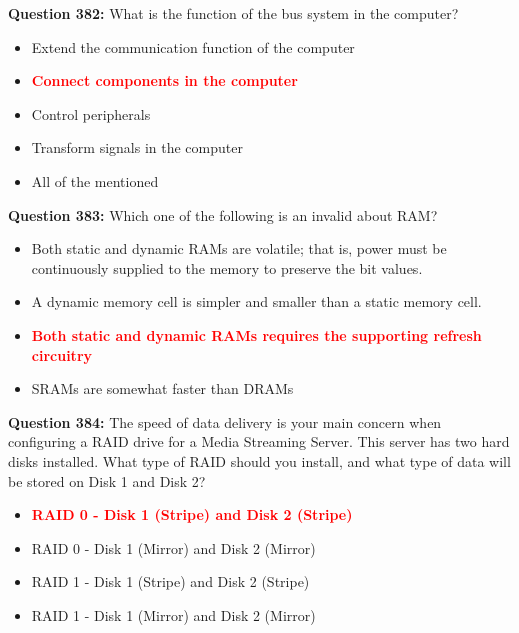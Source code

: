 \documentclass[12pt,a4paper]{article}
\begin{document}
\vspace{0.5cm}

\textbf{Question 382:} What is the function of the bus system in the computer?

\begin{itemize}
    \item[\textbf{A.}] Extend the communication function of the computer
    \item[\textbf{B.}] \textcolor{red}{\textbf{Connect components in the computer}}
    \item[\textbf{C.}] Control peripherals
    \item[\textbf{D.}] Transform signals in the computer
    \item[\textbf{E.}] All of the mentioned
\end{itemize}

\vspace{0.5cm}

\textbf{Question 383:} Which one of the following is an invalid about RAM?

\begin{itemize}
    \item[\textbf{A.}] Both static and dynamic RAMs are volatile; that is, power must be continuously supplied to the memory to preserve the bit values.
    \item[\textbf{B.}] A dynamic memory cell is simpler and smaller than a static memory cell.
    \item[\textbf{C.}] \textcolor{red}{\textbf{Both static and dynamic RAMs requires the supporting refresh circuitry}}
    \item[\textbf{D.}] SRAMs are somewhat faster than DRAMs
\end{itemize}

\vspace{0.5cm}

\textbf{Question 384:} The speed of data delivery is your main concern when configuring a RAID drive for a Media Streaming Server. This server has two hard disks installed. What type of RAID should you install, and what type of data will be stored on Disk 1 and Disk 2?

\begin{itemize}
    \item[\textbf{A.}] \textcolor{red}{\textbf{RAID 0 - Disk 1 (Stripe) and Disk 2 (Stripe)}}
    \item[\textbf{B.}] RAID 0 - Disk 1 (Mirror) and Disk 2 (Mirror)
    \item[\textbf{C.}] RAID 1 - Disk 1 (Stripe) and Disk 2 (Stripe)
    \item[\textbf{D.}] RAID 1 - Disk 1 (Mirror) and Disk 2 (Mirror)
\end{itemize}
\end{document}

